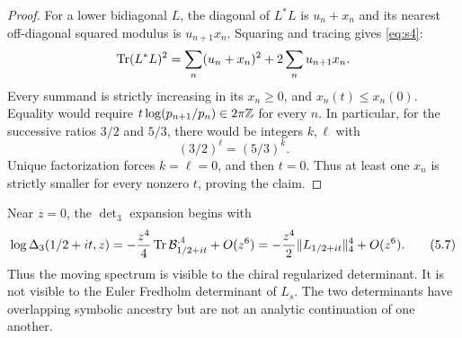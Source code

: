 \begin{proof}
For a lower bidiagonal $L$, the diagonal of $L^*L$ is $u_n+x_n$ and its
nearest off-diagonal squared modulus is $u_{n+1}x_n$.  Squaring and tracing
gives \cref{eq:s4}:
\begin{equation}
 \operatorname{Tr}(L^*L)^2=\sum_n(u_n+x_n)^2+2\sum_nu_{n+1}x_n.
 \label{eq:s4}
\end{equation}
Every summand is strictly increasing in its $x_n\ge0$, and
$x_n(t)\le x_n(0)$.  Equality would require
$t\log(p_{n+1}/p_n)\in2\pi\mathbb Z$ for every $n$.  In particular, for the
successive ratios $3/2$ and $5/3$, there would be integers $k,\ell$ with
\[
 (3/2)^\ell=(5/3)^k.
\]
Unique factorization forces $k=\ell=0$, and then $t=0$.  Thus at least one
$x_n$ is strictly smaller for every nonzero $t$, proving the claim.
\end{proof}

Near $z=0$, the $\det_3$ expansion begins with
\[
 \log\Delta_3(1/2+it,z)
 =-\frac{z^4}{4}\operatorname{Tr}\mathcal B_{1/2+it}^{,4}+O(z^6)
 =-\frac{z^4}{2}\|L_{1/2+it}\|_4^4+O(z^6). \tag{5.7}
\]
Thus the moving spectrum is visible to the chiral regularized determinant.
It is not visible to the Euler Fredholm determinant of $L_s$.  The two
determinants have overlapping symbolic ancestry but are not an analytic
continuation of one another.
